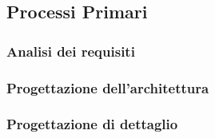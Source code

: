 \subsection{Processi Primari}
\subsubsection{Analisi dei requisiti}
\subsubsection{Progettazione dell'architettura}
\subsubsection{Progettazione di dettaglio}